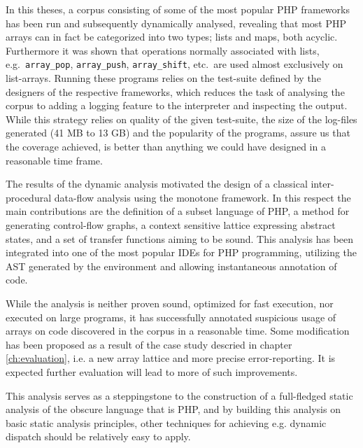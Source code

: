 

In this theses, a corpus consisting of some of the most popular PHP frameworks has been run and subsequently dynamically analysed, revealing that most PHP arrays can in fact be categorized into two types; lists and maps, both acyclic.  Furthermore it was shown that operations normally associated with lists, e.g.\ \texttt{array\_pop}, \texttt{array\_push}, \texttt{array\_shift}, etc.\, are used almost exclusively on list-arrays. Running these programs relies on the test-suite defined by the designers of the respective frameworks, which reduces the task of analysing the corpus to adding a logging feature to the interpreter and inspecting the output. While this strategy relies on quality of the given test-suite, the size of the log-files generated (41 MB to 13 GB) and the popularity of the programs, assure us that the coverage achieved, is better than anything we could have designed in a reasonable time frame.


The results of the dynamic analysis motivated the design of a classical inter-procedural data-flow analysis using the monotone framework. In this respect the main contributions are the definition of a subset language of PHP, a method for generating control-flow graphs, a context sensitive lattice expressing abstract states, and a set of transfer functions aiming to be sound. This analysis has been integrated into one of the most popular IDEs for PHP programming, utilizing the AST generated by the environment and allowing instantaneous annotation of code. 

While the analysis is neither proven sound, optimized for fast execution, nor executed on large programs, it has successfully annotated suspicious usage of arrays on code discovered in the corpus in a reasonable time. Some modification has been proposed as a result of the case study descried in chapter \ref{ch:evaluation}, i.e. a new array lattice and more precise error-reporting. It is expected further evaluation will lead to more of such improvements.

This analysis serves as a steppingstone to the construction of a full-fledged static analysis of the obscure language that is PHP, and by building this analysis on basic static analysis principles, other techniques for achieving e.g. dynamic dispatch should be relatively easy to apply. 






